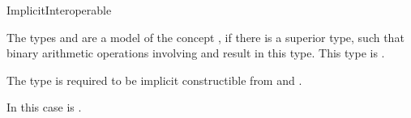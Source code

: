 \begin{ccRefConcept}{ImplicitInteroperable}
\begin{ccAdvanced}
\ccDefinition

The types  and  are a model of the concept 
, if there is a superior type, such that 
binary arithmetic operations involving  and  result in 
this type. This type is . 

The type  is required to be 
implicit constructible from  and . 


In this case  
is .


\ccRefines
 
\ccSeeAlso
{}\\
\\

\end{ccAdvanced}
\end{ccRefConcept}
